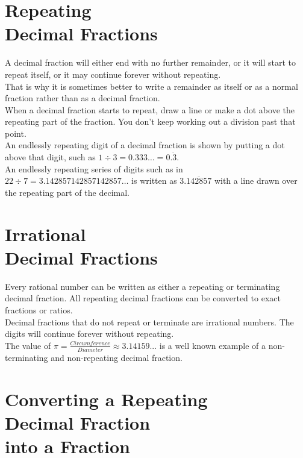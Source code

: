 \documentclass{article}
\begin{document}
\section{Repeating\\Decimal Fractions}

A decimal fraction  will either end with no further remainder, or it will start to repeat itself, or it may continue forever without repeating.\\

That is why it is sometimes better to write a remainder as itself or as a normal fraction rather than as a decimal fraction.\\

When a decimal fraction starts to repeat, draw a line or make a dot above the repeating part of the fraction. You don't keep working out a division past that point.\\

An endlessly repeating digit of a decimal fraction is shown by putting a dot above that digit, such as $1 \div 3 = 0.333\ldots=0.\dot{3}.$\\

An endlessly repeating series of digits such as in $22 \div 7 = 3.142857142857142857\dots$ is written as $3.\overline{142857}$ with a line drawn over the repeating part of the decimal.\\

\section{Irrational\\Decimal Fractions}

Every rational number can be written as either a repeating or terminating decimal fraction. All repeating decimal fractions can be converted to exact fractions or ratios.\\

Decimal fractions that do not repeat or terminate are irrational numbers. The digits will continue forever without repeating.\\

The value of $\pi = \frac{Circumference}{Diameter} \approx 3.14159...$ is a well known example of a non-terminating and non-repeating decimal fraction.\\

\newpage

\section{Converting a Repeating\\Decimal Fraction\\into a Fraction}
\end{document}
